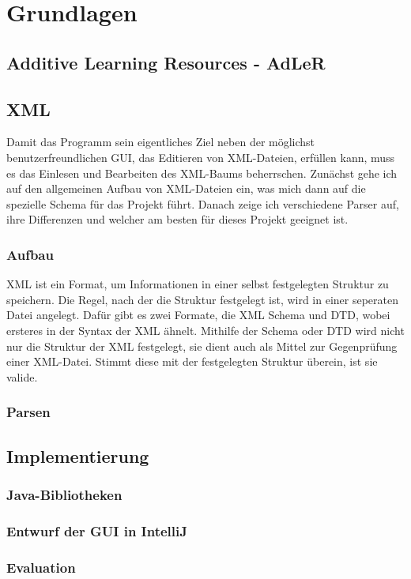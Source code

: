 \section{Grundlagen}

\subsection{Additive Learning Resources - AdLeR}



\subsection{XML}

Damit das Programm sein eigentliches Ziel neben der möglichst benutzerfreundlichen GUI, das Editieren von XML-Dateien, erfüllen kann, muss es das Einlesen und Bearbeiten des XML-Baums beherrschen. Zunächst gehe ich auf den allgemeinen Aufbau von XML-Dateien ein, was mich dann auf die spezielle Schema für das Projekt führt. Danach zeige ich verschiedene Parser auf, ihre Differenzen und welcher am besten für dieses Projekt geeignet ist.
\subsubsection{Aufbau}
XML ist ein Format, um Informationen in einer selbst festgelegten Struktur zu speichern. Die Regel, nach der die Struktur festgelegt ist, wird in einer seperaten Datei angelegt. Dafür gibt es zwei Formate, die XML Schema und DTD, wobei ersteres in der Syntax der XML ähnelt. Mithilfe der Schema oder DTD wird nicht nur die Struktur der XML festgelegt, sie dient auch als Mittel zur Gegenprüfung einer XML-Datei. Stimmt diese mit der festgelegten Struktur überein, ist sie valide.


\subsubsection{Parsen}

\subsection{Implementierung}
\subsubsection{Java-Bibliotheken}
\subsubsection{Entwurf der GUI in IntelliJ}

\subsubsection{Evaluation}

